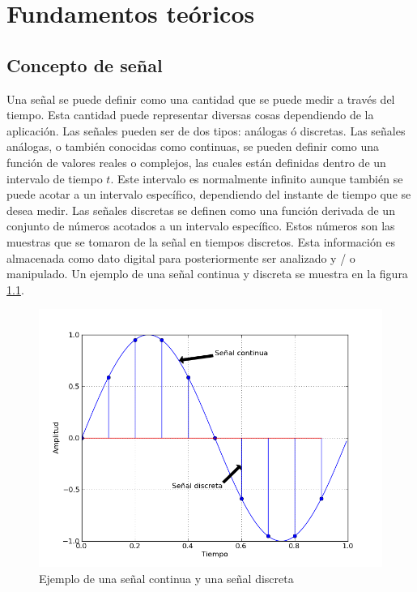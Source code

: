 \chapter{Fundamentos te\'oricos}


\section{Concepto de se\~nal}

Una se\~nal se puede definir como una cantidad que se puede medir a trav\'es del
tiempo. Esta cantidad puede representar diversas cosas dependiendo de la
aplicaci\'on. Las se\~nales pueden ser de dos tipos: an\'alogas \'o discretas.
Las se\~nales an\'alogas, o tambi\'en conocidas como continuas, se pueden
definir como una funci\'on de valores reales o complejos, las cuales est\'an
definidas dentro de un intervalo de tiempo $t$. Este intervalo es normalmente 
infinito aunque tambi\'en se puede acotar a un
intervalo espec\'ifico, dependiendo del instante de tiempo que se desea medir. 
Las se\~nales discretas se definen como una funci\'on derivada de un conjunto de 
n\'umeros acotados a un intervalo espec\'ifico. Estos n\'umeros son las muestras
que se tomaron de la se\~nal en tiempos discretos. Esta informaci\'on es
almacenada como dato digital para posteriormente ser analizado y / o manipulado.
Un ejemplo de una se\~nal continua y discreta se muestra en la figura
\ref{fig:sine}.

\begin{figure}[ht]
\centering
	\includegraphics[width=5in]{figs/sine}
	\caption{Ejemplo de una se\~nal continua y una se\~nal discreta}
	\label{fig:sine}
\end{figure}

